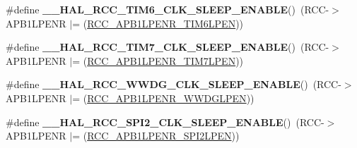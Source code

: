 \begin{DoxyCompactItemize}
\item 
\hypertarget{group___r_c_c___peripheral___clock___sleep___enable___disable_ga906c45719dcf2113473f2c3281926368}{\#define {\bfseries \-\_\-\-\_\-\-H\-A\-L\-\_\-\-R\-C\-C\-\_\-\-T\-I\-M6\-\_\-\-C\-L\-K\-\_\-\-S\-L\-E\-E\-P\-\_\-\-E\-N\-A\-B\-L\-E}()~(R\-C\-C-\/$>$A\-P\-B1\-L\-P\-E\-N\-R $\vert$= (\hyperlink{group___peripheral___registers___bits___definition_ga439a5998fd60c3375411c7db2129ac89}{R\-C\-C\-\_\-\-A\-P\-B1\-L\-P\-E\-N\-R\-\_\-\-T\-I\-M6\-L\-P\-E\-N}))}\label{group___r_c_c___peripheral___clock___sleep___enable___disable_ga906c45719dcf2113473f2c3281926368}

\item 
\hypertarget{group___r_c_c___peripheral___clock___sleep___enable___disable_ga2a1c22a18251e0dac7f77ba8398af543}{\#define {\bfseries \-\_\-\-\_\-\-H\-A\-L\-\_\-\-R\-C\-C\-\_\-\-T\-I\-M7\-\_\-\-C\-L\-K\-\_\-\-S\-L\-E\-E\-P\-\_\-\-E\-N\-A\-B\-L\-E}()~(R\-C\-C-\/$>$A\-P\-B1\-L\-P\-E\-N\-R $\vert$= (\hyperlink{group___peripheral___registers___bits___definition_gab7867dc2695855fa9084a13d06a4299f}{R\-C\-C\-\_\-\-A\-P\-B1\-L\-P\-E\-N\-R\-\_\-\-T\-I\-M7\-L\-P\-E\-N}))}\label{group___r_c_c___peripheral___clock___sleep___enable___disable_ga2a1c22a18251e0dac7f77ba8398af543}

\item 
\hypertarget{group___r_c_c___peripheral___clock___sleep___enable___disable_gaa3978a2e193b921dc24976880dce7a26}{\#define {\bfseries \-\_\-\-\_\-\-H\-A\-L\-\_\-\-R\-C\-C\-\_\-\-W\-W\-D\-G\-\_\-\-C\-L\-K\-\_\-\-S\-L\-E\-E\-P\-\_\-\-E\-N\-A\-B\-L\-E}()~(R\-C\-C-\/$>$A\-P\-B1\-L\-P\-E\-N\-R $\vert$= (\hyperlink{group___peripheral___registers___bits___definition_ga13f3db4ac67bf32c994364cc43f4fe8b}{R\-C\-C\-\_\-\-A\-P\-B1\-L\-P\-E\-N\-R\-\_\-\-W\-W\-D\-G\-L\-P\-E\-N}))}\label{group___r_c_c___peripheral___clock___sleep___enable___disable_gaa3978a2e193b921dc24976880dce7a26}

\item 
\hypertarget{group___r_c_c___peripheral___clock___sleep___enable___disable_ga8a281ca72aff1c9fa87755c3854cc316}{\#define {\bfseries \-\_\-\-\_\-\-H\-A\-L\-\_\-\-R\-C\-C\-\_\-\-S\-P\-I2\-\_\-\-C\-L\-K\-\_\-\-S\-L\-E\-E\-P\-\_\-\-E\-N\-A\-B\-L\-E}()~(R\-C\-C-\/$>$A\-P\-B1\-L\-P\-E\-N\-R $\vert$= (\hyperlink{group___peripheral___registers___bits___definition_ga41dcbf845448cbb1b75c0ad7e83b77cb}{R\-C\-C\-\_\-\-A\-P\-B1\-L\-P\-E\-N\-R\-\_\-\-S\-P\-I2\-L\-P\-E\-N}))}\label{group___r_c_c___peripheral___clock___sleep___enable___disable_ga8a281ca72aff1c9fa87755c3854cc316}


\end{DoxyCompactItemize}

